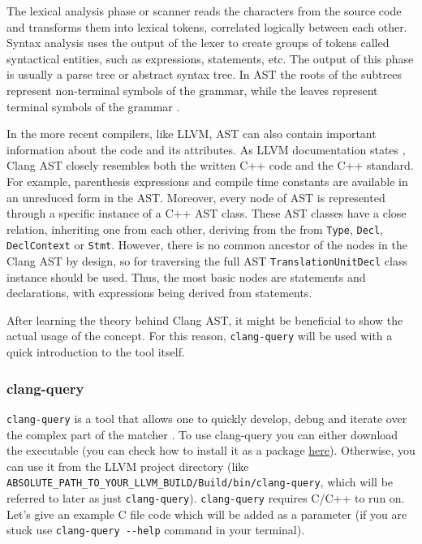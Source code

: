 The lexical analysis phase or scanner reads the characters from the source code and transforms them into lexical tokens, correlated logically between each other. Syntax analysis uses the output of the lexer to create groups of tokens called syntactical entities, such as expressions, statements, etc. The output of this phase is usually a parse tree or abstract syntax tree. In AST the roots of the subtrees represent non-terminal symbols of the grammar, while the leaves represent terminal symbols of the grammar \cite{ast-nasa}. 

In the more recent compilers, like LLVM, AST can also contain important information about the code and its attributes. As LLVM documentation states \cite{llvm-ast}, Clang AST closely resembles both the written C++ code and the C++ standard. For example, parenthesis expressions and compile time constants are available in an unreduced form in the AST. Moreover, every node of AST is represented through a specific instance of a C++ AST class. These AST classes have a close relation, inheriting one from each other, deriving from the from \lstinline{Type}, \lstinline{Decl}, \lstinline{DeclContext} or \lstinline{Stmt}. However, there is no common ancestor of the nodes in the Clang AST by design, so for traversing the full AST \lstinline{TranslationUnitDecl} class instance should be used. Thus, the most basic nodes are statements and declarations, with expressions being derived from statements. 

After learning the theory behind Clang AST, it might be beneficial to show the actual usage of the concept. For this reason, \lstinline{clang-query} will be used with a quick introduction to the tool itself.

\subsubsection{clang-query}

\lstinline{clang-query} is a tool that allows one to quickly develop, debug and iterate over the complex part of the matcher \cite{mozilla-clang-query}. To use clang-query you can either download the executable (you can check how to install it as a package \href{https://command-not-found.com/clang-query}{here}). Otherwise, you can use it from the LLVM project directory (like \lstinline{ABSOLUTE_PATH_TO_YOUR_LLVM_BUILD/Build/bin/clang-query}, which will be referred to later as just \lstinline{clang-query}). \lstinline{clang-query}  requires C/C++ to run on. Let's give an example C file code which will be added as a parameter (if you are stuck use \lstinline{clang-query --help} command in your terminal). 

